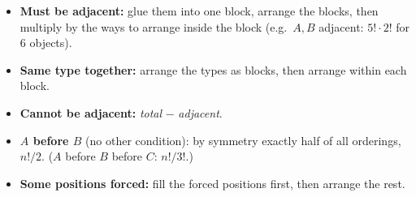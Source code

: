 \documentclass[11pt]{article}
\begin{document}
\begin{methodbox}
\begin{itemize}
\item \textbf{Must be adjacent:} glue them into one block, arrange the blocks, then multiply by the ways to arrange inside the block (e.g.\ $A,B$ adjacent: $5!\cdot2!$ for 6 objects).
\item \textbf{Same type together:} arrange the types as blocks, then arrange within each block.
\item \textbf{Cannot be adjacent:} \emph{total} $-$ \emph{adjacent}.
\item \textbf{$A$ before $B$} (no other condition): by symmetry exactly half of all orderings, $n!/2$. ($A$ before $B$ before $C$: $n!/3!$.)
\item \textbf{Some positions forced:} fill the forced positions first, then arrange the rest.
\end{itemize}
\end{methodbox}
\end{document}
